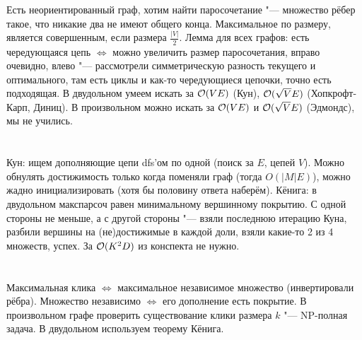 \section{} %
Есть неориентированный граф, хотим найти паросочетание "--- множество рёбер такое, что никакие два не имеют общего конца.
Максимальное по размеру, является совершенным, если размера $\frac{|V|}{2}$.
Лемма для всех графов: есть чередующаяся цепь $\iff$ можно увеличить размер паросочетания, вправо очевидно, влево "--- рассмотрели симметрическую разность текущего и оптимального, там есть циклы и как-то чередующиеся цепочки, точно есть подходящая.
В двудольном умеем искать за $\mathcal{O}(VE)$ (Кун), $\mathcal{O}(\sqrt V E)$ (Хопкрофт-Карп, Диниц).
В произвольном можно искать за $\mathcal{O}(VE)$ и $\mathcal{O}(\sqrt VE)$ (Эдмондс), мы не учились.

\section{} %
Кун: ищем дополняющие цепи dfs'ом по одной (поиск за $E$, цепей $V$).
Можно обнулять достижимость только когда поменяли граф (тогда $O(|M|E)$), можно жадно инициализировать (хотя бы половину ответа наберём).
Кёнига: в двудольном макспарсоч равен минимальному вершинному покрытию.
С одной стороны не меньше, а с другой стороны "--- взяли последнюю итерацию Куна, разбили вершины на (не)достижимые в каждой доли, взяли какие-то 2 из 4 множеств, успех.
За $\mathcal{O}(K^2D)$ из конспекта не нужно.

\section{} %
Максимальная клика $\iff$ максимальное независимое множество (инвертировали рёбра).
Множество независимо $\iff$ его дополнение есть покрытие.
В произвольном графе проверить существование клики размера $k$ "--- NP-полная задача.
В двудольном используем теорему Кёнига.

\section{} %

\section{} %
\TODO

